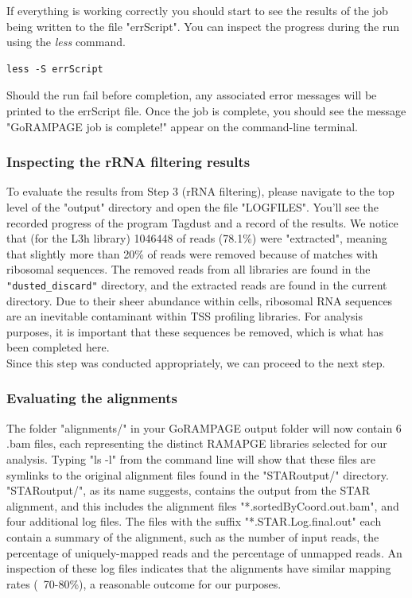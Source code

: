 \documentclass[runningheads,a4paper]{llncs}
\begin{document}
\begin{linenumbers}
If everything is working correctly you should start to see the results of the job being written to the file "errScript".
You can inspect the progress during the run using the \textit{less} command. 

\noindent
\begin{verbatim}
less -S errScript
\end{verbatim}

Should the run fail before completion, any associated error messages will be printed to the errScript file. Once the job is complete, you should see the message "GoRAMPAGE job is complete!" appear on the command-line terminal.

\subsubsection{Inspecting the rRNA filtering results}

To evaluate the results from Step 3 (rRNA filtering), please navigate to the top level of the "output" directory and open the file "LOGFILES".
You'll see the recorded progress of the program Tagdust and a record of the results.
We notice that (for the L3h library) 1046448 of reads (78.1\%) were "extracted", meaning that slightly more than 20\% of reads were removed because of matches with ribosomal sequences.
The removed reads from all libraries are found in the \texttt{"dusted\_discard"} directory, and the extracted reads are found in the current directory. 
Due to their sheer abundance within cells, ribosomal RNA sequences are an inevitable contaminant within TSS profiling libraries. 
For analysis purposes, it is important that these sequences be removed, which is what has been completed here.\\
Since this step was conducted appropriately, we can proceed to the next step.

\subsubsection{Evaluating the alignments}

The folder "alignments/" in your GoRAMPAGE output folder will now contain 6 .bam files, each representing the distinct RAMAPGE libraries selected for our analysis.
Typing "ls -l" from the command line will show that these files are symlinks to the original alignment files found in the "STARoutput/" directory.
"STARoutput/", as its name suggests, contains the output from the STAR alignment, and this includes the alignment files "*.sortedByCoord.out.bam", and four additional log files.
The files with the suffix "*.STAR.Log.final.out" each contain a summary of the alignment, such as the number of input reads, the percentage of uniquely-mapped reads and the percentage of unmapped reads.
An inspection of these log files indicates that the alignments have similar mapping rates (~70-80\%), a reasonable outcome for our purposes.\\


\end{linenumbers}
\end{document}
